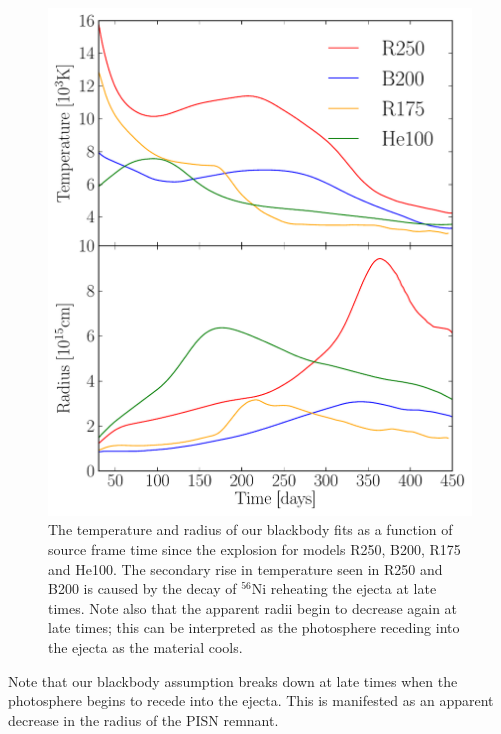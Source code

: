 \documentclass{thesis}
\begin{document}
\begin{figure}
  \begin{center}
    \includegraphics[width=\columnwidth]{bbmodels}
    \caption{The temperature and radius of our blackbody
      fits as a function of source frame time since the explosion
      for models R250, B200, R175 and He100.  The secondary rise in
      temperature seen in R250 and B200 is caused by the decay of
      $^{56}$Ni reheating the ejecta at late times.  Note also that the
      apparent radii begin to decrease again at late times; this can
      be interpreted as the photosphere receding into the ejecta as
      the material cools.}
    \label{bbmodels}
  \end{center}
\end{figure}
Note that our blackbody assumption breaks down at late times when the
photosphere begins to recede into the ejecta.  This is manifested as
an apparent decrease in the radius of the PISN remnant.
\end{document}
